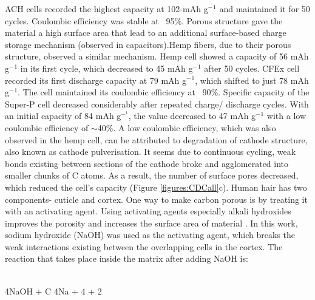 ACH cells recorded the highest capacity at 102-mAh g$^-{^1}$ and maintained it for 50 cycles. Coulombic efficiency was stable at ~95$\%$. Porous structure gave the material a high surface area that lead to an additional surface-based charge storage mechanism (observed in capacitors).Hemp fibers, due to their porous structure, observed a similar mechanism. Hemp cell showed a capacity of 56 mAh g$^-{^1}$ in its first cycle, which decreased to 45 mAh g$^-{^1}$ after 50 cycles. 
CFEx cell recorded its first discharge capacity at 79 mAh g$^-{^1}$, which shifted to just 78 mAh g$^-{^1}$. The cell maintained its coulombic efficiency at ~90$\%$. 
Specific capacity of the Super-P cell decreased considerably after repeated charge/ discharge cycles. With an initial capacity of 84 mAh g$^-^1$, the value decreased to 47 mAh g$^-{^1}$ with a low coulombic efficiency of $\sim$40$\%$. 
A low coulombic efficiency, which was also observed in the hemp cell, can be attributed to degradation of cathode structure, also known as cathode pulverisation. It seems due to continuous cycling, weak bonds existing between sections of the cathode broke and agglomerated into smaller chunks of C atoms. As a result, the number of surface pores decreased, which reduced the cell's capacity (Figure \ref{figures:CDCall}c). 
Human hair has two components- cuticle and cortex. One way to make carbon porous is by treating it with an activating agent. Using activating agents especially alkali hydroxides improves the porosity and increases the surface area of material \cite{liu_hair-based_2017} .
In this work, sodium hydroxide (NaOH) was used as the activating agent, which breaks the weak interactions existing between the overlapping cells in the cortex. The reaction that takes place inside the matrix after adding NaOH is:
\begin{center}
    \\4NaOH + C \longrightarrow 4Na + 4 + 2 \cite{qian_human_2013}
\end{center}


